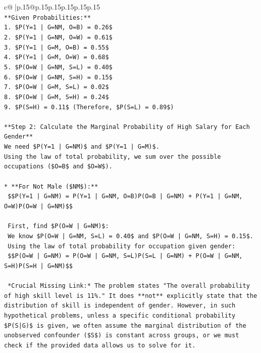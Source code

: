 \documentclass{article}
\begin{document}
{\begin{supertabular}{c@{$\;$}|p{.15\linewidth}@{}p{.15\linewidth}p{.15\linewidth}p{.15\linewidth}p{.15\linewidth}p{.15\linewidth}}
{{{\\ 
\texttt{**Given Probabilities:**} \\
\texttt{1.  \$P(Y=1 | G=NM, O=B) = 0.26\$} \\
\texttt{2.  \$P(Y=1 | G=NM, O=W) = 0.61\$} \\
\texttt{3.  \$P(Y=1 | G=M, O=B) = 0.55\$} \\
\texttt{4.  \$P(Y=1 | G=M, O=W) = 0.68\$} \\
\texttt{5.  \$P(O=W | G=NM, S=L) = 0.40\$} \\
\texttt{6.  \$P(O=W | G=NM, S=H) = 0.15\$} \\
\texttt{7.  \$P(O=W | G=M, S=L) = 0.02\$} \\
\texttt{8.  \$P(O=W | G=M, S=H) = 0.24\$} \\
\texttt{9.  \$P(S=H) = 0.11\$ (Therefore, \$P(S=L) = 0.89\$)} \\
\\ 
\texttt{**Step 2: Calculate the Marginal Probability of High Salary for Each Gender**} \\
\texttt{We need \$P(Y=1 | G=NM)\$ and \$P(Y=1 | G=M)\$.} \\
\texttt{Using the law of total probability, we sum over the possible occupations (\$O=B\$ and \$O=W\$).} \\
\\ 
\texttt{*   **For Not Male (\$NM\$):**} \\
\texttt{    \$\$P(Y=1 | G=NM) = P(Y=1 | G=NM, O=B)P(O=B | G=NM) + P(Y=1 | G=NM, O=W)P(O=W | G=NM)\$\$} \\
\\ 
\texttt{    First, find \$P(O=W | G=NM)\$:} \\
\texttt{    We know \$P(O=W | G=NM, S=L) = 0.40\$ and \$P(O=W | G=NM, S=H) = 0.15\$.} \\
\texttt{    Using the law of total probability for occupation given gender:} \\
\texttt{    \$\$P(O=W | G=NM) = P(O=W | G=NM, S=L)P(S=L | G=NM) + P(O=W | G=NM, S=H)P(S=H | G=NM)\$\$} \\
\\ 
\texttt{    *Crucial Missing Link:* The problem states "The overall probability of high skill level is 11\%." It does **not** explicitly state that the distribution of skill is independent of gender. However, in such hypothetical problems, unless a specific conditional probability \$P(S|G)\$ is given, we often assume the marginal distribution of the unobserved confounder (\$S\$) is constant across groups, or we must check if the provided data allows us to solve for it.} \\
}}}
\end{supertabular}}
\end{document}
